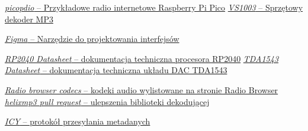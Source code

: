 \documentclass[12pt]{report}
\begin{document}
\begin{thebibliography}{9}
		\href{https://github.com/episource/picopdio}{\textit{picopdio} -- Przykładowe radio internetowe Raspberry Pi Pico}
		\href{https://botland.com.pl/odtwarzacze-mp3-wav-ogg-midi/14308-odtwarzacz-mp3-vs1003-z-mikrofonem-5903351241786.html}{\textit{VS1003} -- Sprzętowy dekoder MP3}
		
		\href{https://www.figma.com}{\textit{Figma} -- Narzędzie do projektowania interfejsów}
		
		\href{https://datasheets.raspberrypi.com/rp2040/rp2040-datasheet.pdf}{\textit{RP2040 Datasheet} -- dokumentacja techniczna procesora RP2040}
		\href{http://www.lampizator.eu/lampizator/LINKS%20AND%20DOWNLOADS/DATAMINING/tda%201543.pdf}{\textit{TDA1543 Datasheet} -- dokumentacja techniczna układu DAC TDA1543}
		
		\href{https://www.radio-browser.info/codecs}{\textit{Radio browser codecs} -- kodeki audio wylistowane na stronie Radio Browser}
		\href{https://github.com/ultraembedded/libhelix-mp3/pull/3}{\textit{helixmp3 pull request} -- ulepszenia biblioteki dekodującej}
		
		\href{https://gist.github.com/niko/2a1d7b2d109ebe7f7ca2f860c3505ef0#file-icy_meta-md}{\textit{ICY} -- protokół przesyłania metadanych}
		
	\end{thebibliography}
	
\end{document}
